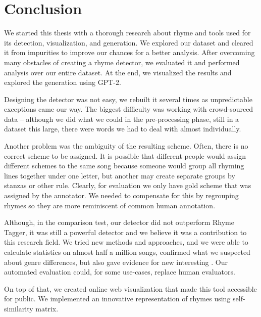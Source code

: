 \chapter*{Conclusion}\label{conclusion}
We started this thesis with a thorough research about rhyme\deleted[comment={čárku mezi dva členy koordinace nedává ani Oxford comma style}]{,} and tools used for its detection, visualization, and generation. We explored our dataset and cleared it from impurities to improve our chances for a better analysis. After overcoming many obstacles of creating a rhyme detector, we evaluated it and performed  analysis over our entire dataset. At the end, we visualized the results and explored the generation using GPT-2.

Designing the detector was not easy, we rebuilt it several times as unpredictable exceptions came our way. The biggest difficulty was working with crowd-sourced data -- although we did what we could in the pre-processing phase, still in a dataset this large, there  were words we had to deal with almost individually.

Another problem was the ambiguity of the resulting scheme. Often, there is no  correct scheme to be assigned. It is possible that different people would assign different schemes to the same song\deleted{,} because someone would group all rhyming lines together under one letter, but another  may create separate groups by stanzas or other rule. Clearly, for evaluation we only have  gold scheme that was assigned by the annotator. We needed to compensate for this by regrouping rhymes so they are more reminiscent of common human annotation.

Although, in the comparison test, our detector did not outperform Rhyme Tagger, it was still a powerful detector and we believe it was a contribution to this research field. We tried new methods and approaches, and we were able to calculate statistics on almost half a million songs,  confirmed what we suspected about genre differences, but also gave evidence for new interesting . Our automated evaluation could, for some use-cases, replace human evaluators.

On top of that, we created  online web visualization that made this tool accessible for public. We implemented an innovative representation of rhymes using  self-similarity matrix.

